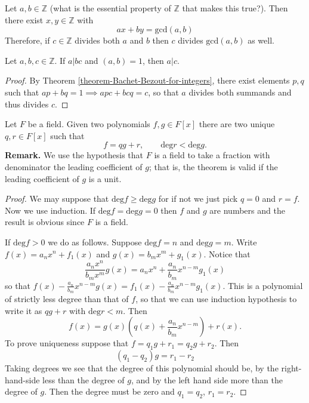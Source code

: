 \begin{theorem}
\label{theorem-Bachet-Bezout-for-integers}
\begin{reference}
\cite[Theorem 1.7]{MMST}
\end{reference}
Let $a,b \in \mathbb{Z}$ (what is the essential property of $\mathbb{Z}$ that
makes this true?). Then
there exist $x,y \in \mathbb{Z}$ with
 $$
ax+by=\text{gcd}(a,b)
$$
Therefore, if $c \in \mathbb{Z}$ divides both $a$ and $b$ then $c$ divides
$\text{gcd}(a,b)$ as well.
\end{theorem}

\begin{lemma}
\label{lemma-relatively-prime-and-divides-implies-divides}
Let $a,b,c \in \mathbb{Z}$. If $a|bc$ and $(a,b)=1$, then $a|c$.
\end{lemma}

\begin{proof}
By Theorem \ref{theorem-Bachet-Bezout-for-integers}, 
there exist elements $p,q$ such
that $ap+bq=1\implies apc+bcq=c$, so that $a$ divides both summands and thus
divides $c$.
\end{proof}

\begin{theorem}
\label{theorem-division-algoritm-for-polynomials}
\begin{reference}
\cite[Theorem 1.48]{MMST}
\end{reference}
Let $F$ be a field. Given two polynomials $f,g \in F[x]$ there are two unique
$q,r \in F[x]$ such that
$$
f=qg+r,\qquad \text{deg}r<\text{deg}g.
$$
{\bf Remark.} We use the hypothesis that $F$ is a field to take a fraction with
denominator the leading coefficient of $g$; that is, the theorem is valid if the
leading coefficient of $g$ is a unit.
\end{theorem}

\begin{proof}
We may suppose that $\text{deg}f \geq \text{deg}g$ for if not we just pick
$q=0$ and $r=f$. Now we use induction. 
If $\text{deg}f=\text{deg}g=0$ then $f$ and $g$ are numbers and the result is
obvious since $F$ is a field.

If $\text{deg}f>0$ we do as follows. Suppose $\text{deg}f=n$ and
$\text{deg}g=m$. Write $f(x)=a_nx^n+f_1(x)$ and $g(x)=b_mx^m+g_1(x)$. Notice
that
$$
\frac{a_nx^n}{b_mx^m}g(x)=a_nx^n+\frac{a_n}{b_m}x^{n-m}g_1(x)
$$
so that $f(x)-\frac{a_n}{b_m}x^{n-m}g(x)=f_1(x)-\frac{a_n}{b_m}x^{n-m}g_1(x)$.
This is a polynomial of strictly less degree than that of $f$, so that we can
use induction hypothesis to write it as $qg+r$ with $\text{deg}r<m$. Then
$$
f(x)=g(x)\left(q(x)+\frac{a_n}{b_m}x^{n-m}\right)+r(x).
$$
To prove uniqueness suppose that $f=q_1g+r_1=q_2g+r_2$.
Then
$$
(q_1-q_2)g=r_1-r_2
$$
Taking degrees we see that the degree of this polynomial should be,
by the right-hand-side less than the degree of $g$,
and by the left hand side more than the degree of $g$.
Then the degree must be zero and $q_1=q_2$, $r_1=r_2$.
\end{proof}

